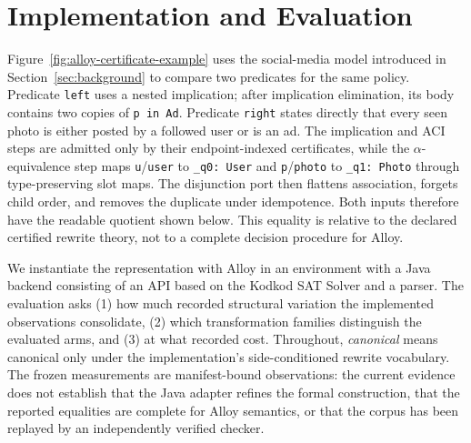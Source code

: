 \section{Implementation and Evaluation}

\label{sec:evaluation}
Figure~\ref{fig:alloy-certificate-example} uses the social-media model
introduced in Section~\ref{sec:background} to compare two predicates for
the same policy. Predicate \texttt{left}
uses a nested implication; after implication elimination, its body
contains two copies of \texttt{p in Ad}. Predicate \texttt{right}
states directly that every seen photo is either posted by a followed
user or is an ad. The implication and ACI steps are admitted only by
their endpoint-indexed certificates, while the $\alpha$-equivalence
step maps \texttt{u}/\texttt{user} to \texttt{\_q0: User} and
\texttt{p}/\texttt{photo} to \texttt{\_q1: Photo} through
type-preserving slot maps. The disjunction port then flattens
association, forgets child order, and removes the duplicate under
idempotence. Both inputs therefore have the readable quotient shown
below. This equality is relative to the declared certified rewrite
theory, not to a complete decision procedure for Alloy.

We instantiate the representation with Alloy in an environment with a Java backend consisting of an API based on the Kodkod SAT Solver and a parser. The evaluation
asks (1) how much recorded structural variation the implemented observations
consolidate, (2) which transformation families distinguish the evaluated arms,
and (3) at what recorded cost.  Throughout, \emph{canonical} means canonical
only under the implementation's side-conditioned rewrite vocabulary.  The
frozen measurements are manifest-bound observations: the current evidence does
not establish that the Java adapter refines the formal construction, that the
reported equalities are complete for Alloy semantics, or that the corpus has
been replayed by an independently verified checker. 

